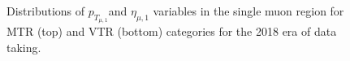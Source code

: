 \begin{figure}[htbp]
{    }
  \caption{Distributions of $p_{T_{\mu,1}}$and $\eta_{\mu,1}$ variables in the single muon region for MTR (top) and VTR (bottom) categories for the 2018 era of data taking.}
  \label{app:2018_Wmunu_1}
\end{figure}




